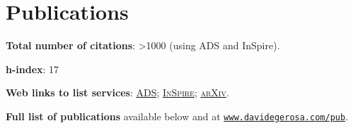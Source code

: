 \documentclass[a4paper]{moderncv}
\begin{document}
\section{Publications}

\textcolor{mark_color}{\textbf{Total number of citations}}:  {>1000}  (using ADS and InSpire).

\textcolor{mark_color}{\textbf{h-index}}: 17

\textcolor{mark_color}{\textbf{Web links to list services}}:
\href{http://labs.adsabs.harvard.edu/adsabs/search/?q=author%3A%22Gerosa%2C+Davide%22&month_from=&year_from=&month_to=&year_to=&db_f=&nr=&article=1&bigquery=&re_sort_type=CITED&re_sort_dir=desc}{\textsc{ADS}};
\href{http://inspirehep.net/search?ln=en&ln=en&p=exactauthor%3AD.Gerosa.1&of=hb&action_search=Search&sf=&so=d&rm=citation&rg=25&sc=0}{\textsc{InSpire}};
\href{http://arxiv.org/a/gerosa_d_1.html}{\textsc{arXiv}}.

\textbf{Full list of publications} available below and at \href{http://www.davidegerosa.com/pub}{\texttt{www.davidegerosa.com/pub}}.



\end{document}
